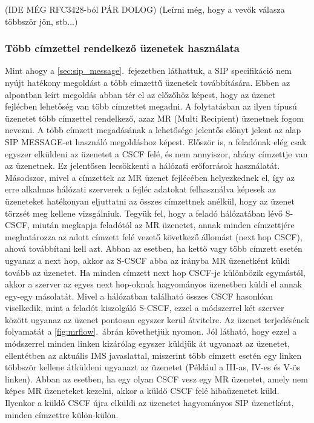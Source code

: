 {\color{red}(IDE MÉG RFC3428-ból PÁR DOLOG)
(Leírni még, hogy a vevők válasza többször jön, stb...)}

\subsubsection{Több címzettel rendelkező üzenetek használata}
Mint ahogy a \ref{sec:sip_message}.~fejezetben láthattuk, a SIP specifikáció nem nyújt hatékony megoldást a több címzettű üzenetek továbbítására. Ebben az alpontban leírt megoldás abban tér el az előzőhöz képest, hogy az üzenet fejlécben lehetőség van több címzettet megadni. A folytatásban az ilyen típusú üzenetet több címzettel rendelkező, azaz MR (Multi Recipient) üzenetnek fogom nevezni. A több címzett megadásának a lehetősége jelentős előnyt jelent az alap SIP MESSAGE-et használó megoldáshoz képest. Először is, a feladónak elég csak egyszer elküldeni az üzenetet a CSCF felé, és nem annyiszor, ahány címzettje van az üzenetnek. Ez jelentősen lecsökkenti a hálózati erőforrások használatát. Másodszor, mivel a címzettek az MR üzenet fejlécében helyezkednek el, így az erre alkalmas hálózati szerverek a fejléc adatokat felhasználva képesek az üzeneteket hatékonyan eljuttatni az összes címzettnek anélkül, hogy az üzenet törzsét meg kellene vizsgálniuk. Tegyük fel, hogy a feladó hálózatában lévő S-CSCF, miután megkapja feladótól az MR üzenetet, annak minden címzettjére meghatározza az adott címzett felé vezető következő állomást (next hop CSCF), ahová továbbítani kell azt. Abban az esetben, ha kettő vagy több címzett esetén ugyanaz a next hop, akkor az S-CSCF abba az irányba MR üzenetként küldi tovább az üzenetet. Ha minden címzett next hop CSCF-je különbözik egymástól, akkor a szerver az egyes next hop-oknak hagyományos üzenetben küldi el annak egy-egy másolatát. Mivel a hálózatban található összes CSCF hasonlóan viselkedik, mint a feladót kiszolgáló S-CSCF, ezzel a módszerrel két szerver között ugyanaz az üzenet pontosan egyszer kerül átvitelre. Az üzenet terjedésének folyamatát a \ref{fig:mrflow}.~ábrán követhetjük nyomon. Jól látható, hogy ezzel a módszerrel minden linken kizárólag egyszer küldjük át ugyanazt az üzenetet, ellentétben az aktuális IMS javaslattal, miszerint több címzett esetén egy linken többször kellene átküldeni ugyanazt az üzenetet (Például a III-as, IV-es és V-ös linken). Abban az esetben, ha egy olyan CSCF vesz egy MR üzenetet, amely nem képes MR üzeneteket kezelni, akkor a küldő CSCF felé hibaüzenetet küld. Ilyenkor a küldő CSCF újra elküldi az üzenetet hagyományos SIP üzenetként, minden címzettre külön-külön. 


